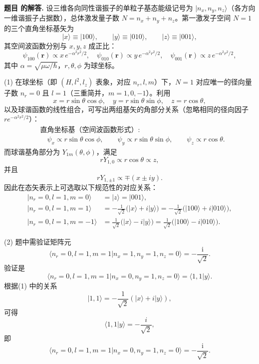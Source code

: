 \documentclass[12pt, a4paper, oneside]{ctexart}
\newcounter{problemname}
\newenvironment{solution}
  {\par\noindent\textbf{题目 \theproblemname 的解答. }}
  {\par}
\begin{document}
\begin{solution}
  设三维各向同性谐振子的单粒子基态能级记号为 $\lvert n_x,n_y,n_z\rangle$（各方向一维谐振子占据数），总体激发量子数
$N=n_x+n_y+n_z$。第一激发子空间 $N=1$ 的三个直角坐标基矢为
\[
\lvert x\rangle\equiv\lvert 100\rangle,\qquad
\lvert y\rangle\equiv\lvert 010\rangle,\qquad
\lvert z\rangle\equiv\lvert 001\rangle,
\]
其空间波函数分别与 $x,y,z$ 成正比：
\[
\psi_{100}(\boldsymbol r)\propto x\,e^{-\alpha^2 r^2/2},\quad
\psi_{010}(\boldsymbol r)\propto y\,e^{-\alpha^2 r^2/2},\quad
\psi_{001}(\boldsymbol r)\propto z\,e^{-\alpha^2 r^2/2},
\]
其中 $\alpha=\sqrt{\mu\omega/\hbar}$，$r,\theta,\phi$ 为球坐标。

(1) 在球坐标（即 $(H,l^2,l_z)$ 表象，对应 $n_r,l,m$）下，$N=1$ 对应唯一的径向量子数 $n_r=0$ 且 $l=1$（三重简并，$m=1,0,-1$）。利用
\[
x=r\sin\theta\cos\phi,\quad y=r\sin\theta\sin\phi,\quad z=r\cos\theta,
\]
以及球谐函数的线性组合，可写出两组基矢的角部分关系（忽略相同的径向因子 $r e^{-\alpha^2 r^2/2}$）：
\[
\begin{aligned}
&\text{直角坐标基（空间波函数形式）:}\\
&\quad \psi_x\propto r\sin\theta\cos\phi,\qquad
\psi_y\propto r\sin\theta\sin\phi,\qquad
\psi_z\propto r\cos\theta.
\end{aligned}
\]
而球谐基角部分为 $Y_{1m}(\theta,\phi)$，满足
\[
rY_{1,0}\propto r\cos\theta\propto z,
\]
并且
\[
rY_{1,\pm1}\propto \mp (x\pm i y).
\]
因此在态矢表示上可选取以下规范性的对应关系：
\[
\boxed{\;
\begin{aligned}
\lvert n_r=0,l=1,m=0\rangle&=\lvert z\rangle=\lvert 001\rangle,\\[4pt]
\lvert n_r=0,l=1,m=1\rangle&=-\frac{1}{\sqrt2}\big(\lvert x\rangle + i\lvert y\rangle\big)
=-\frac{1}{\sqrt2}\big(\lvert100\rangle + i\lvert010\rangle\big),\\[4pt]
\lvert n_r=0,l=1,m=-1\rangle&=\frac{1}{\sqrt2}\big(\lvert x\rangle - i\lvert y\rangle\big)
=\frac{1}{\sqrt2}\big(\lvert100\rangle - i\lvert010\rangle\big).
\end{aligned}
\; }
\]


(2) 题中需验证矩阵元
\[
\langle n_r=0,l=1,m=1\vert n_x=1,n_y=1,n_z=0\rangle=-\frac{\mathrm i}{\sqrt2}.
\]
验证是
\[
\langle n_r=0,l=1,m=1\vert n_x=0,n_y=1,n_z=0\rangle
=\langle 1,1\vert y\rangle.
\]
根据(1) 中的关系
\[
\lvert 1,1\rangle=-\frac{1}{\sqrt2}(\lvert x\rangle + i\lvert y\rangle),
\]
可得
\[
\langle 1,1\vert y\rangle=-\frac{i}{\sqrt2},
\]
即
\[
\boxed{\;
\langle n_r=0,l=1,m=1\vert n_x=0,n_y=1,n_z=0\rangle=-\frac{\mathrm i}{\sqrt2}.
\; }
\]


\end{solution}
\end{document}
